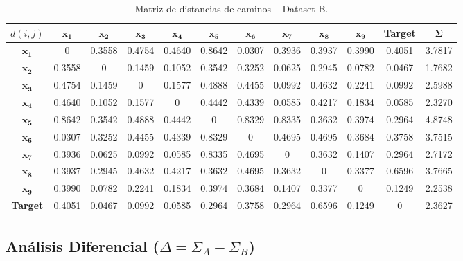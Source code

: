\documentclass[12pt,a4paper]{article}
\begin{document}
\begin{table}[H]
    \centering
    \footnotesize
    \begin{tabular}{c|cccccccccc|c}
        \toprule
        $d(i,j)$ & $\mathbf{x_1}$ & $\mathbf{x_2}$ & $\mathbf{x_3}$ & $\mathbf{x_4}$ & $\mathbf{x_5}$ & $\mathbf{x_6}$ & $\mathbf{x_7}$ & $\mathbf{x_8}$ & $\mathbf{x_9}$ & \textbf{Target} & $\mathbf{\Sigma}$ \\
        \midrule
        $\mathbf{x_1}$   & 0 & 0.3558 & 0.4754 & 0.4640 & 0.8642 & 0.0307 & 0.3936 & 0.3937 & 0.3990 & 0.4051 & 3.7817 \\
        $\mathbf{x_2}$   & 0.3558 & 0 & 0.1459 & 0.1052 & 0.3542 & 0.3252 & 0.0625 & 0.2945 & 0.0782 & 0.0467 & 1.7682 \\
        $\mathbf{x_3}$   & 0.4754 & 0.1459 & 0 & 0.1577 & 0.4888 & 0.4455 & 0.0992 & 0.4632 & 0.2241 & 0.0992 & 2.5988 \\
        $\mathbf{x_4}$   & 0.4640 & 0.1052 & 0.1577 & 0 & 0.4442 & 0.4339 & 0.0585 & 0.4217 & 0.1834 & 0.0585 & 2.3270 \\
        $\mathbf{x_5}$   & 0.8642 & 0.3542 & 0.4888 & 0.4442 & 0 & 0.8329 & 0.8335 & 0.3632 & 0.3974 & 0.2964 & 4.8748 \\
        $\mathbf{x_6}$   & 0.0307 & 0.3252 & 0.4455 & 0.4339 & 0.8329 & 0 & 0.4695 & 0.4695 & 0.3684 & 0.3758 & 3.7515 \\
        $\mathbf{x_7}$   & 0.3936 & 0.0625 & 0.0992 & 0.0585 & 0.8335 & 0.4695 & 0 & 0.3632 & 0.1407 & 0.2964 & 2.7172 \\
        $\mathbf{x_8}$   & 0.3937 & 0.2945 & 0.4632 & 0.4217 & 0.3632 & 0.4695 & 0.3632 & 0 & 0.3377 & 0.6596 & 3.7665 \\
        $\mathbf{x_9}$   & 0.3990 & 0.0782 & 0.2241 & 0.1834 & 0.3974 & 0.3684 & 0.1407 & 0.3377 & 0 & 0.1249 & 2.2538 \\
        \textbf{Target}  & 0.4051 & 0.0467 & 0.0992 & 0.0585 & 0.2964 & 0.3758 & 0.2964 & 0.6596 & 0.1249 & 0 & 2.3627 \\
        \bottomrule
    \end{tabular}
    \caption{Matriz de distancias de caminos -- Dataset B.}
\end{table}

\subsection{Análisis Diferencial ($\Delta = \Sigma_A - \Sigma_B$)}
\end{document}
